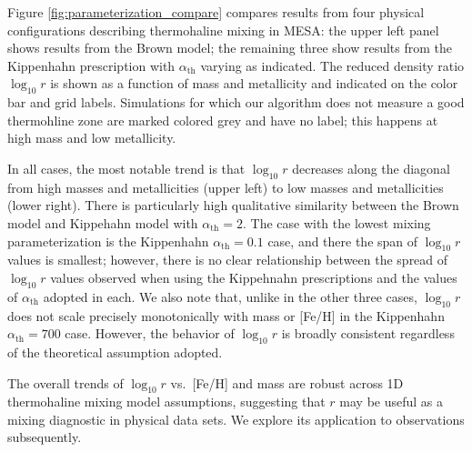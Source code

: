 %
%
Figure \ref{fig:parameterization_compare} compares results from four physical configurations describing thermohaline mixing in MESA: the upper left panel shows results from the Brown model; the remaining three show results from the Kippenhahn prescription with $\alpha_{\text{th}}$ varying as indicated. The reduced density ratio $\log_{10} r$ is shown as a function of mass and metallicity and indicated on the color bar and grid labels.
Simulations for which our algorithm does not measure a good thermohline zone are marked colored grey and have no label; this happens at high mass and low metallicity.
%

In all cases, the most notable trend is that $\log_{10} r$ decreases along the diagonal from high masses and metallicities (upper left) to low masses and metallicities (lower right). 
There is particularly high qualitative similarity between the Brown model and Kippehahn model with $\alpha_{\text{th}} = 2$. 
The case with the lowest mixing parameterization is the Kippenhahn $\alpha_{\text{th}} = 0.1$ case, and there the span of $\log_{10} r$ values is smallest; however, there is no clear relationship between the spread of $\log_{10} r$ values observed when using the Kippehnahn prescriptions and the values of $\alpha_{\text{th}}$ adopted in each. 
We also note that, unlike in the other three cases, $\log_{10} r$ does not scale precisely monotonically with mass or [Fe/H] in the Kippenhahn $\alpha_{\text{th}} = 700$ case. 
However, the behavior of $\log_{10} r$ is broadly consistent regardless of the theoretical assumption adopted.

The overall trends of $\log_{10} r$ vs.~[Fe/H] and mass are  
robust across 1D thermohaline mixing model assumptions, suggesting that $r$ may be useful as a mixing diagnostic in physical data sets. We explore its application to observations subsequently.


